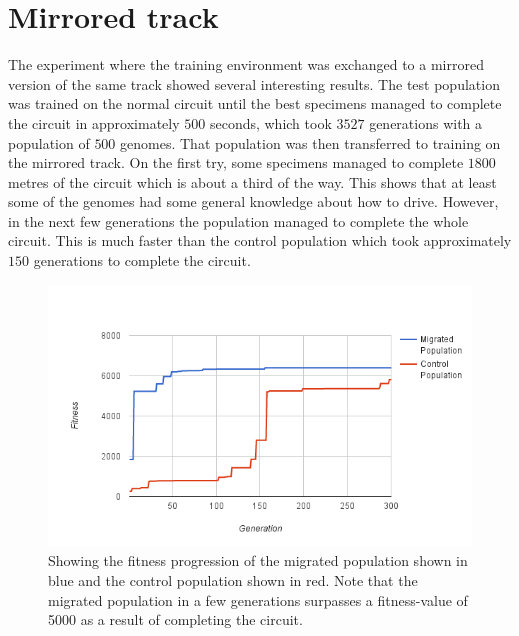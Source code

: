 


\section{Mirrored track}
\label{result:mirror}
The experiment where the training environment was exchanged to a mirrored version of the same track showed several interesting results. The test population was trained on the normal circuit until the best specimens managed to complete the circuit in approximately $500$ seconds, which took $3527$ generations with a population of $500$ genomes. That population was then transferred to training on the mirrored track. On the first try, some specimens managed to complete $1800$ metres of the circuit which is about a third of the way. This shows that at least some of the genomes had some general knowledge about how to drive. However, in the next few generations the population managed to complete the whole circuit. This is much faster than the control population which took approximately $150$ generations to complete the circuit. 


\begin{figure}[H]
\includegraphics[width=\textwidth]{report/images/graphs/mirror_migration}
\centering
\caption{Showing the fitness progression of the migrated population shown in blue and the control population shown in red. Note that the migrated population in a few generations surpasses a fitness-value of 5000 as a result of completing the circuit.}
\label{fig:mirrordata}
\end{figure}

